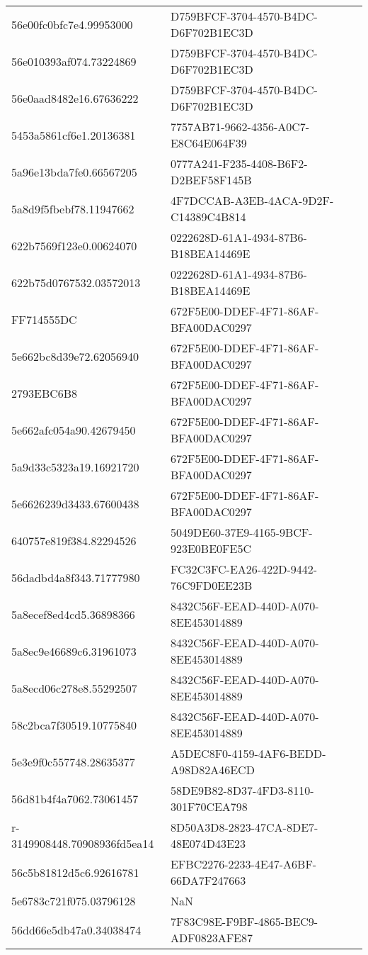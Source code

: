 \begin{tabular}{ll}
56e00fc0bfc7e4.99953000 & D759BFCF-3704-4570-B4DC-D6F702B1EC3D \\
56e010393af074.73224869 & D759BFCF-3704-4570-B4DC-D6F702B1EC3D \\
56e0aad8482e16.67636222 & D759BFCF-3704-4570-B4DC-D6F702B1EC3D \\
5453a5861cf6e1.20136381 & 7757AB71-9662-4356-A0C7-E8C64E064F39 \\
5a96e13bda7fe0.66567205 & 0777A241-F235-4408-B6F2-D2BEF58F145B \\
5a8d9f5fbebf78.11947662 & 4F7DCCAB-A3EB-4ACA-9D2F-C14389C4B814 \\
622b7569f123e0.00624070 & 0222628D-61A1-4934-87B6-B18BEA14469E \\
622b75d0767532.03572013 & 0222628D-61A1-4934-87B6-B18BEA14469E \\
FF714555DC & 672F5E00-DDEF-4F71-86AF-BFA00DAC0297 \\
5e662bc8d39e72.62056940 & 672F5E00-DDEF-4F71-86AF-BFA00DAC0297 \\
2793EBC6B8 & 672F5E00-DDEF-4F71-86AF-BFA00DAC0297 \\
5e662afc054a90.42679450 & 672F5E00-DDEF-4F71-86AF-BFA00DAC0297 \\
5a9d33c5323a19.16921720 & 672F5E00-DDEF-4F71-86AF-BFA00DAC0297 \\
5e6626239d3433.67600438 & 672F5E00-DDEF-4F71-86AF-BFA00DAC0297 \\
640757e819f384.82294526 & 5049DE60-37E9-4165-9BCF-923E0BE0FE5C \\
56dadbd4a8f343.71777980 & FC32C3FC-EA26-422D-9442-76C9FD0EE23B \\
5a8ecef8ed4cd5.36898366 & 8432C56F-EEAD-440D-A070-8EE453014889 \\
5a8ec9e46689c6.31961073 & 8432C56F-EEAD-440D-A070-8EE453014889 \\
5a8ecd06c278e8.55292507 & 8432C56F-EEAD-440D-A070-8EE453014889 \\
58c2bca7f30519.10775840 & 8432C56F-EEAD-440D-A070-8EE453014889 \\
5e3e9f0c557748.28635377 & A5DEC8F0-4159-4AF6-BEDD-A98D82A46ECD \\
56d81b4f4a7062.73061457 & 58DE9B82-8D37-4FD3-8110-301F70CEA798 \\
r-3149908448.70908936fd5ea14 & 8D50A3D8-2823-47CA-8DE7-48E074D43E23 \\
56c5b81812d5c6.92616781 & EFBC2276-2233-4E47-A6BF-66DA7F247663 \\
5e6783c721f075.03796128 & NaN \\
56dd66e5db47a0.34038474 & 7F83C98E-F9BF-4865-BEC9-ADF0823AFE87 \\

\end{tabular}
